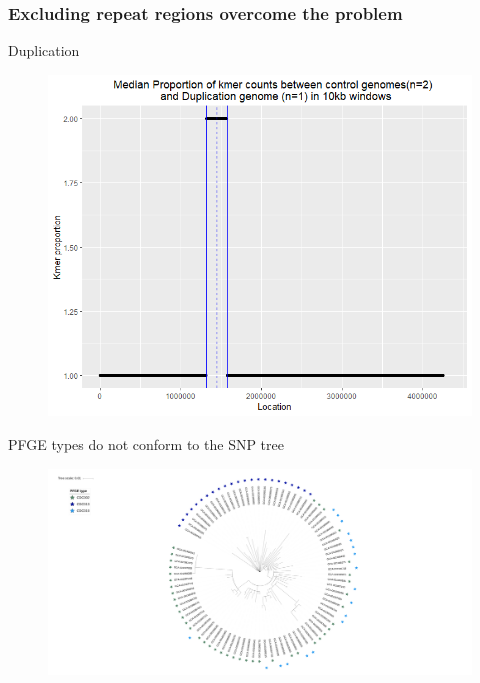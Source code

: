 \documentclass{article}
\begin{document}
\subsubsection{Excluding repeat regions overcome the problem}


Duplication

\begin{figure}[h!]
\centering
\includegraphics[scale=0.6]{Kmer_dupe.png}
\caption{}
\label{fig:kmer_dupe1}
\end{figure}

PFGE types do not conform to the SNP tree
\begin{figure}[h!]
\centering

\includegraphics[width=\textwidth{}]{PFGE_tree.png}
\caption{}
\label{fig:PFGE_tree}
\end{figure}









%
%
\end{document}

